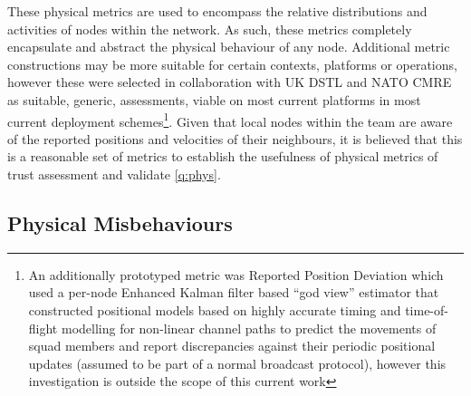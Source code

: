 These physical metrics are used to encompass the relative distributions and activities of nodes within the network. 
As such, these metrics completely encapsulate and abstract the physical behaviour of any node.
Additional metric constructions may be more suitable for certain contexts, platforms or operations, however these were selected in collaboration with UK DSTL and NATO CMRE as suitable, generic, assessments, viable on most current platforms in most current deployment schemes\footnote{An additionally prototyped metric was Reported Position Deviation which used a per-node Enhanced Kalman filter based ``god view'' estimator that constructed positional models based on highly accurate timing and time-of-flight modelling for non-linear channel paths to predict the movements of squad members and report discrepancies against their periodic positional updates (assumed to be part of a normal broadcast protocol), however this investigation is outside the scope of this current work}.
Given that local nodes within the team are aware of the reported positions and velocities of their neighbours, it is believed that this is a reasonable set of metrics to establish the usefulness of physical metrics of trust assessment and validate \autoref{q:phys}.


\subsection{Physical Misbehaviours}

